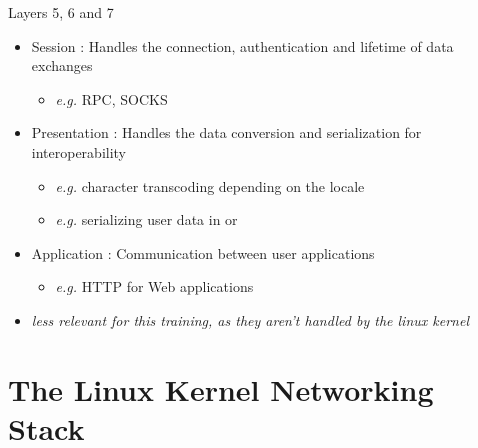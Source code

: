\begin{frame}{Layers 5, 6 and 7}
	\begin{itemize}
		\item Session : Handles the connection, authentication and lifetime of data exchanges
			\begin{itemize}
				\item \textit{e.g.} RPC, SOCKS
			\end{itemize}
		\item Presentation : Handles the data conversion and serialization for interoperability
			\begin{itemize}
				\item \textit{e.g.} character transcoding depending on the locale
				\item \textit{e.g.} serializing user data in  or 
			\end{itemize}
		\item Application : Communication between user applications
			\begin{itemize}
				\item \textit{e.g.} HTTP for Web applications
			\end{itemize}
		\item \textit{less relevant for this training, as they aren't handled by the linux kernel}
	\end{itemize}
\end{frame}

\section{The Linux Kernel Networking Stack}

